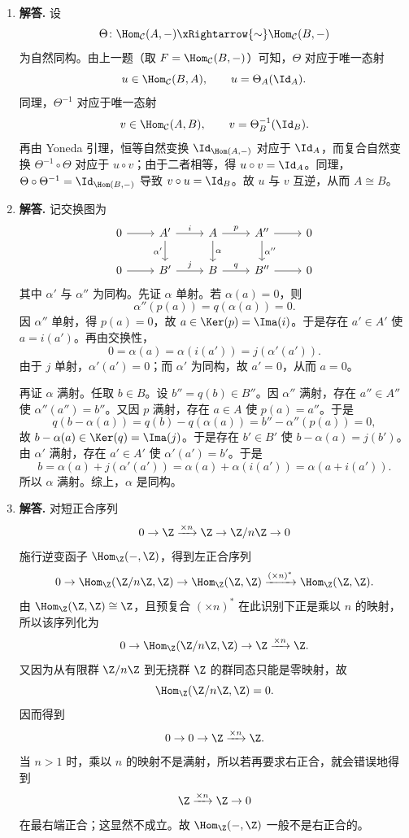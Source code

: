 \begin{enumerate}[label=\textbf{A.\arabic*.}, leftmargin=*, itemsep=1em]
  \item \textbf{解答.} 设
  \[
    \Theta\colon \Hom_{\mathcal C}(A,-)\xRightarrow{\sim}\Hom_{\mathcal C}(B,-)
  \]
  为自然同构。由上一题（取 $F=\Hom_{\mathcal C}(B,-)$）可知，$\Theta$ 对应于唯一态射
  \[
    u\in \Hom_{\mathcal C}(B,A),
    \qquad u=\Theta_A(\Id_A).
  \]
  同理，$\Theta^{-1}$ 对应于唯一态射
  \[
    v\in \Hom_{\mathcal C}(A,B),
    \qquad v=\Theta^{-1}_B(\Id_B).
  \]
  再由 Yoneda 引理，恒等自然变换 $\Id_{\Hom(A,-)}$ 对应于 $\Id_A$，而复合自然变换 $\Theta^{-1}\circ \Theta$ 对应于 $u\circ v$；由于二者相等，得 $u\circ v=\Id_A$。同理，$\Theta\circ \Theta^{-1}=\Id_{\Hom(B,-)}$ 导致 $v\circ u=\Id_B$。故 $u$ 与 $v$ 互逆，从而 $A\cong B$。

  \item \textbf{解答.} 记交换图为
  \[
  \begin{tikzcd}
  0 \arrow[r] & A' \arrow[r,"i"] \arrow[d,"\alpha'"'] & A \arrow[r,"p"] \arrow[d,"\alpha"] & A'' \arrow[r] \arrow[d,"\alpha''"] & 0 \\
  0 \arrow[r] & B' \arrow[r,"j"] & B \arrow[r,"q"] & B'' \arrow[r] & 0
  \end{tikzcd}
  \]
  其中 $\alpha'$ 与 $\alpha''$ 为同构。先证 $\alpha$ 单射。若 $\alpha(a)=0$，则
  \[
    \alpha''(p(a))=q(\alpha(a))=0.
  \]
  因 $\alpha''$ 单射，得 $p(a)=0$，故 $a\in \Ker(p)=\Ima(i)$。于是存在 $a'\in A'$ 使 $a=i(a')$。再由交换性，
  \[
    0=\alpha(a)=\alpha(i(a'))=j(\alpha'(a')).
  \]
  由于 $j$ 单射，$\alpha'(a')=0$；而 $\alpha'$ 为同构，故 $a'=0$，从而 $a=0$。

  再证 $\alpha$ 满射。任取 $b\in B$。设 $b''=q(b)\in B''$。因 $\alpha''$ 满射，存在 $a''\in A''$ 使 $\alpha''(a'')=b''$。又因 $p$ 满射，存在 $a\in A$ 使 $p(a)=a''$。于是
  \[
    q(b-\alpha(a))=q(b)-q(\alpha(a))=b''-\alpha''(p(a))=0,
  \]
  故 $b-\alpha(a)\in \Ker(q)=\Ima(j)$。于是存在 $b'\in B'$ 使 $b-\alpha(a)=j(b')$。由 $\alpha'$ 满射，存在 $a'\in A'$ 使 $\alpha'(a')=b'$。于是
  \[
    b=\alpha(a)+j(\alpha'(a'))=\alpha(a)+\alpha(i(a'))=\alpha(a+i(a')).
  \]
  所以 $\alpha$ 满射。综上，$\alpha$ 是同构。

  \item \textbf{解答.} 对短正合序列
  \[
    0\to \Z \xrightarrow{\times n} \Z \to \Z/n\Z \to 0
  \]
  施行逆变函子 $\Hom_{\Z}(-,\Z)$，得到左正合序列
  \[
    0\to \Hom_{\Z}(\Z/n\Z,\Z)\to \Hom_{\Z}(\Z,\Z)
    \xrightarrow{(\times n)^*} \Hom_{\Z}(\Z,\Z).
  \]
  由 $\Hom_{\Z}(\Z,\Z)\cong \Z$，且预复合 $ (\times n)^*$ 在此识别下正是乘以 $n$ 的映射，所以该序列化为
  \[
    0\to \Hom_{\Z}(\Z/n\Z,\Z)\to \Z \xrightarrow{\times n} \Z.
  \]
  又因为从有限群 $\Z/n\Z$ 到无挠群 $\Z$ 的群同态只能是零映射，故
  \[
    \Hom_{\Z}(\Z/n\Z,\Z)=0.
  \]
  因而得到
  \[
    0\to 0\to \Z \xrightarrow{\times n} \Z.
  \]
  当 $n>1$ 时，乘以 $n$ 的映射不是满射，所以若再要求右正合，就会错误地得到
  \[
    \Z \xrightarrow{\times n} \Z \to 0
  \]
  在最右端正合；这显然不成立。故 $\Hom_{\Z}(-,\Z)$ 一般不是右正合的。


\end{enumerate}
